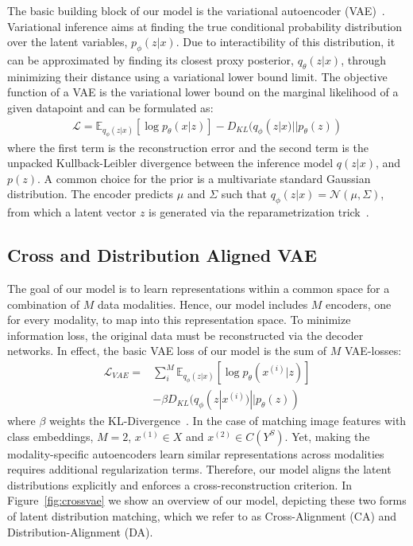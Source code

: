 \documentclass[10pt,twocolumn,letterpaper]{article}
\newcommand{\myparagraph}[1]{\vspace{6pt}\noindent{\bf #1}}
\begin{document}
\myparagraph{Variational Autoencoder (VAE).}
The basic building block of our model is the variational autoencoder (VAE)~\cite{kingmawelling}.
Variational inference aims at finding the true conditional probability distribution over the latent variables, $p_\phi(z|x)$. Due to interactibility of this distribution, it can be approximated by finding its closest proxy posterior, $q_\theta(z|x)$, through minimizing their distance using a variational lower bound limit. The objective function of a VAE is the variational lower bound on the marginal likelihood of a given datapoint and can be formulated as:
\begin{align}
\mathcal{L} = \mathbb{E}_{q_\phi(z|x)}[\log p_\theta(x|z)]
- D_{KL}( q_\phi(z|x)||p_\theta(z) )
\end{align}
where the first term is the reconstruction error and the second term is the unpacked Kullback-Leibler divergence between the inference model $q(z|x)$, and $p(z)$. A common choice for the prior is a multivariate standard Gaussian distribution. The encoder predicts $\mu$ and $\Sigma$ such that $q_\phi(z|x)= \mathcal{N}(\mu,\Sigma)$, from which a latent vector $z$ is generated via the reparametrization trick~\cite{kingmawelling}.


\subsection{Cross and Distribution Aligned VAE}

The goal of our model is to learn representations within a common space for a combination of $M$ data modalities. Hence, our model includes $M$ encoders, one for every modality, to map into this representation space. To minimize information loss, the original data must be reconstructed via the decoder networks. In effect, the basic VAE loss of our model is the sum of $M$ VAE-losses:\begin{align}
\mathcal{L}_{VAE} = & \sum_i^M \mathbb{E}_{q_\phi(z|x)}[\log p_\theta(x^{(i)}|z)] \\
&- \beta D_{KL}( q_\phi(z|x^{(i)})||p_\theta(z) ) \nonumber
\end{align}
where $\beta$ weights the KL-Divergence~\cite{higgins2016beta}.
In the case of matching image features with class embeddings, $M=2$, $x^{(1)} \in X$ and $x^{(2)} \in C(Y^S)$. Yet, making the modality-specific autoencoders learn similar representations across modalities requires additional regularization terms. Therefore, our model aligns the latent distributions explicitly and enforces a cross-reconstruction criterion. In Figure~\ref{fig:crossvae} we show an overview of our model, depicting these two forms of latent distribution matching, which we refer to as Cross-Alignment (CA) and Distribution-Alignment (DA).
\end{document}
